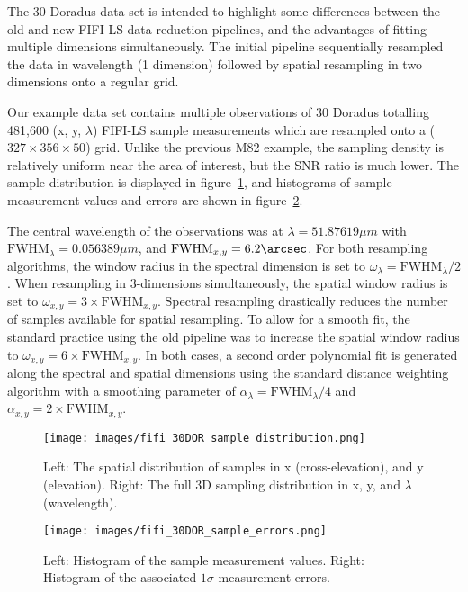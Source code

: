 The 30 Doradus data set is intended to highlight some differences between the
old and new FIFI-LS data reduction pipelines, and the advantages of fitting
multiple dimensions simultaneously.
The initial pipeline sequentially resampled the data in wavelength (1 dimension)
followed by spatial resampling in two dimensions onto a regular grid.

Our example data set contains multiple observations of 30 Doradus
totalling 481,600 (x, y, $\lambda$) FIFI-LS sample measurements which are
resampled onto a ($327 \times 356 \times 50$) grid.
Unlike the previous M82 example, the sampling density is relatively uniform
near the area of interest, but the SNR ratio is much lower.
The sample distribution is displayed in
figure~\ref{fig:fifi-30DOR-sample-distribution}, and histograms of sample
measurement values and errors are shown in
figure~\ref{fig:fifi-30DOR-sample-errors}.

The central wavelength of the observations was at $\lambda = 51.87619 \mu m$
with $\text{FWHM}_{\lambda} = 0.056389 \mu m$, and
$\text{FWHM}_{x,y} = 6.2\arcsec$.
For both resampling algorithms, the window radius in the spectral dimension
is set to $\omega_{\lambda} = \text{FWHM}_{\lambda} / 2$.
When resampling in 3-dimensions simultaneously, the spatial window radius
is set to $\omega_{x,y} = 3 \times \text{FWHM}_{x, y}$.
Spectral resampling drastically reduces the number of samples available for
spatial resampling.
To allow for a smooth fit, the standard practice using the old pipeline was to
increase the spatial window radius to
$\omega_{x,y} = 6 \times \text{FWHM}_{x, y}$.
In both cases, a second order polynomial fit is generated along the spectral and
spatial dimensions using the standard distance weighting algorithm with a
smoothing parameter of
$\alpha_{\lambda} = \text{FWHM}_{\lambda} / 4$ and
$\alpha_{x,y} = 2 \times \text{FWHM}_{x,y}$.

\begin{figure}[H]
  \begin{center}
  \texttt{[image: images/fifi\_30DOR\_sample\_distribution.png]}
  \caption{Left: The spatial distribution of samples in x (cross-elevation),
           and y (elevation).  Right: The full 3D sampling distribution in
           x, y, and $\lambda$ (wavelength).}
  \label{fig:fifi-30DOR-sample-distribution}
  \end{center}
\end{figure}

\begin{figure}[H]
  \begin{center}
  \texttt{[image: images/fifi\_30DOR\_sample\_errors.png]}
  \caption{Left: Histogram of the sample measurement values.  Right:
           Histogram of the associated $1\sigma$ measurement errors.}
  \label{fig:fifi-30DOR-sample-errors}
  \end{center}
\end{figure}


